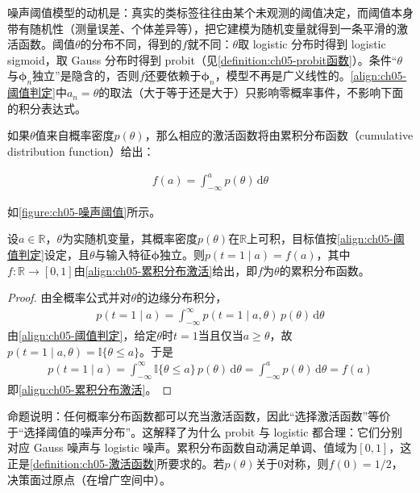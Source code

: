 \documentclass[../../main.tex]{subfiles}
\begin{document}
\begin{remark}
噪声阈值模型的动机是：真实的类标签往往由某个未观测的阈值决定，而阈值本身带有随机性（测量误差、个体差异等），把它建模为随机变量就得到一条平滑的激活函数。阈值$\theta$的分布不同，得到的$f$就不同：$\theta$取 logistic 分布时得到 logistic sigmoid，取 Gauss 分布时得到 probit（见\cref{definition:ch05-probit函数}）。条件“$\theta$与$\boldsymbol{\phi}_n$独立”是隐含的，否则$f$还要依赖于$\boldsymbol{\phi}_n$，模型不再是广义线性的。\eqref{align:ch05-阈值判定}中$a_n=\theta$的取法（大于等于还是大于）只影响零概率事件，不影响下面的积分表达式。
\end{remark}

如果$\theta$值来自概率密度$p(\theta)$，那么相应的激活函数将由累积分布函数（cumulative distribution function）给出：

\begin{align}
  f(a)=\int_{-\infty}^{a}p(\theta)\,\mathrm{d}\theta
  \label{align:ch05-累积分布激活}
\end{align}

如\cref{figure:ch05-噪声阈值}所示。

\begin{proposition}[噪声阈值模型的激活函数]\label{proposition:ch05-噪声阈值激活}
设$a\in\mathbb{R}$，$\theta$为实随机变量，其概率密度$p(\theta)$在$\mathbb{R}$上可积，目标值按\eqref{align:ch05-阈值判定}设定，且$\theta$与输入特征$\boldsymbol{\phi}$独立。则$p(t=1\mid a)=f(a)$，其中$f:\mathbb{R}\to[0,1]$由\eqref{align:ch05-累积分布激活}给出，即$f$为$\theta$的累积分布函数。
\end{proposition}

\begin{proof}
由全概率公式并对$\theta$的边缘分布积分，
\begin{align}
  p(t=1\mid a)=\int_{-\infty}^{\infty}p(t=1\mid a,\theta)\,p(\theta)\,\mathrm{d}\theta
\end{align}
由\eqref{align:ch05-阈值判定}，给定$\theta$时$t=1$当且仅当$a\geqslant\theta$，故$p(t=1\mid a,\theta)=\mathbb{I}\{\theta\leqslant a\}$。于是
\begin{align}
  p(t=1\mid a)=\int_{-\infty}^{\infty}\mathbb{I}\{\theta\leqslant a\}\,p(\theta)\,\mathrm{d}\theta=\int_{-\infty}^{a}p(\theta)\,\mathrm{d}\theta=f(a)
\end{align}
即\eqref{align:ch05-累积分布激活}。
\end{proof}

\begin{remark}
命题说明：任何概率分布函数都可以充当激活函数，因此“选择激活函数”等价于“选择阈值的噪声分布”。这解释了为什么 probit 与 logistic 都合理：它们分别对应 Gauss 噪声与 logistic 噪声。累积分布函数自动满足单调、值域为$[0,1]$，这正是\cref{definition:ch05-激活函数}所要求的。若$p(\theta)$关于0对称，则$f(0)=1/2$，决策面过原点（在增广空间中）。
\end{remark}
\end{document}
